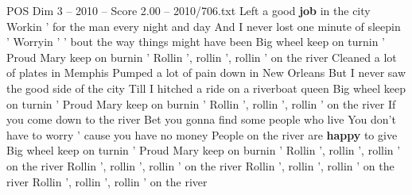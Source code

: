 \begin{textsample}{POS Dim 3 – 2010 – Score 2.00 – 2010/706.txt}  \label{ex:f3_pos_030}
Left a good \textbf{job} in the city Workin ' for the man every night and day And I never lost one minute of sleepin ' Worryin ' ' bout the way things might have been Big wheel keep on turnin ' Proud Mary keep on burnin ' Rollin ', rollin ', rollin ' on the river Cleaned a lot of plates in Memphis Pumped a lot of pain down in New Orleans But I never saw the good side of the city Till I hitched a ride on a riverboat queen Big wheel keep on turnin ' Proud Mary keep on burnin ' Rollin ', rollin ', rollin ' on the river If you come down to the river Bet you gonna find some people who live You don't have to worry ' cause you have no money People on the river are \textbf{happy} to give Big wheel keep on turnin ' Proud Mary keep on burnin ' Rollin ', rollin ', rollin ' on the river Rollin ', rollin ', rollin ' on the river Rollin ', rollin ', rollin ' on the river Rollin ', rollin ', rollin ' on the river

\end{textsample}
